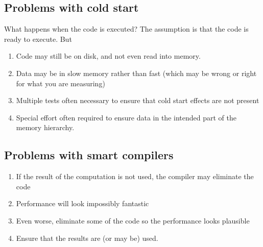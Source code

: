 \documentclass[%
oneside,                 %
final,                   %
10pt]{article}
\begin{document}
\noindent
\subsection*{Problems with cold start}

What happens when the code is executed? The assumption is that the code is ready to
execute. But
\begin{enumerate}
\item Code may still be on disk, and not even read into memory.

\item Data may be in slow memory rather than fast (which may be wrong or right for what you are measuring)

\item Multiple tests often necessary to ensure that cold start effects are not present

\item Special effort often required to ensure data in the intended part of the memory hierarchy.
\end{enumerate}

\noindent
\subsection*{Problems with smart compilers}

\begin{enumerate}
\item If the result of the computation is not used, the compiler may eliminate the code

\item Performance will look impossibly fantastic

\item Even worse, eliminate some of the code so the performance looks plausible

\item Ensure that the results are (or may be) used.
\end{enumerate}

\noindent
\end{document}
